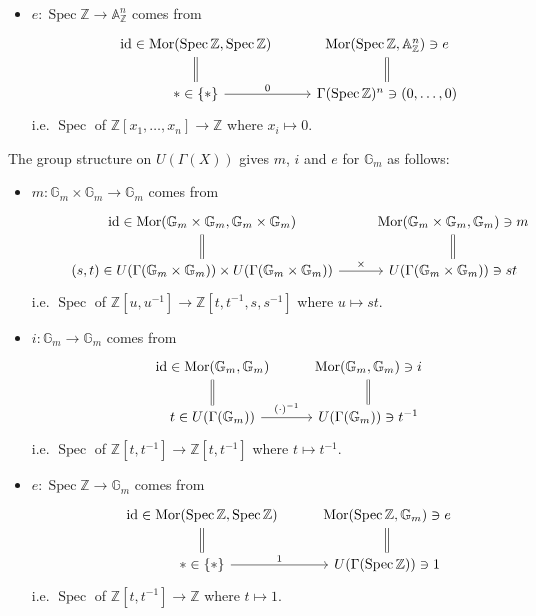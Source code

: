 \documentclass{report}
\newcommand{\id}{{\mathrm{id}}} %
\newcommand{\A}{\mathbb{A}}
\newcommand{\G}{\mathbb{G}}
\newcommand{\Z}{\mathbb{Z}}
\DeclareMathOperator{\Mor}{Mor}
\DeclareMathOperator{\Spec}{Spec}
\begin{document}
\begin{enumerate}[label=\textbf{6.6.\Alph*.}]
\begin{itemize}
		      \item $e:\Spec\Z\to\A^n_\Z$ comes from
		            \begin{equation*}
			            \begin{tikzcd}
				            &\id\in\Mor(\Spec\Z,\Spec\Z) \ar[d,equal]
				            &\Mor(\Spec\Z,\A^n_\Z)\ni e \ar[d,equal] \\
				            &*\in\{*\} \ar[r,"0"]
				            &\Gamma(\Spec\Z)^n\ni(0,\ldots,0)
			            \end{tikzcd}
		            \end{equation*}
		            i.e. $\Spec$ of $\Z[x_1,\ldots,x_n]\to\Z$ where $x_i\mapsto0$.
	      \end{itemize}
	      The group structure on $U(\Gamma(X))$ gives $m$, $i$ and $e$ for
	      $\G_m$ as follows:
	      \begin{itemize}
		      \item $m:\G_m\times\G_m\to\G_m$ comes from
		            \begin{equation*}
			            \begin{tikzcd}
				            &\id\in\Mor(\G_m\times\G_m,\G_m\times\G_m) \ar[d,equal]
				            &\Mor(\G_m\times\G_m,\G_m)\ni m \ar[d,equal] \\
				            &(s,t)\in U(\Gamma(\G_m\times\G_m))\times U(\Gamma(\G_m\times\G_m)) \ar[r,"\times"]
				            &U(\Gamma(\G_m\times\G_m))\ni st
			            \end{tikzcd}
		            \end{equation*}
		            i.e. $\Spec$ of $\Z[u,u^{-1}]\to\Z[t,t^{-1},s,s^{-1}]$ where
		            $u\mapsto st$.

		      \item $i:\G_m\to\G_m$ comes from
		            \begin{equation*}
			            \begin{tikzcd}
				            &\id\in\Mor(\G_m,\G_m) \ar[d,equal]
				            &\Mor(\G_m,\G_m)\ni i \ar[d,equal] \\
				            &t\in U(\Gamma(\G_m)) \ar[r,"(\cdot)^{-1}"]
				            &U(\Gamma(\G_m))\ni t^{-1}
			            \end{tikzcd}
		            \end{equation*}
		            i.e. $\Spec$ of $\Z[t,t^{-1}]\to\Z[t,t^{-1}]$ where
		            $t\mapsto t^{-1}$.

		      \item $e:\Spec\Z\to\G_m$ comes from
		            \begin{equation*}
			            \begin{tikzcd}
				            &\id\in\Mor(\Spec\Z,\Spec\Z) \ar[d,equal]
				            &\Mor(\Spec\Z,\G_m)\ni e \ar[d,equal] \\
				            &*\in\{*\} \ar[r,"1"]
				            &U(\Gamma(\Spec\Z))\ni1
			            \end{tikzcd}
		            \end{equation*}
		            i.e. $\Spec$ of $\Z[t,t^{-1}]\to\Z$ where $t\mapsto1$.
	      \end{itemize}


\end{enumerate}
\end{document}
